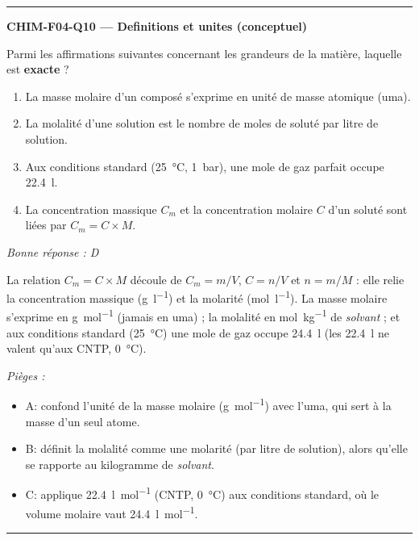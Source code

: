 \documentclass[11pt,a4paper]{article}
\begin{document}
\vspace{8pt}\hrule\vspace{8pt}
\noindent\textbf{CHIM-F04-Q10 --- Definitions et unites (conceptuel)}\par
Parmi les affirmations suivantes concernant les grandeurs de la matière, laquelle est \textbf{exacte} ?
\begin{enumerate}[label=\Alph*)]
\item La masse molaire d'un composé s'exprime en unité de masse atomique (uma).
\item La molalité d'une solution est le nombre de moles de soluté par litre de solution.
\item Aux conditions standard (\qty{25}{\celsius}, \qty{1}{\bar}), une mole de gaz parfait occupe \qty{22.4}{\litre}.
\item La concentration massique $C_m$ et la concentration molaire $C$ d'un soluté sont liées par $C_m = C\times M$.
\end{enumerate}
\textit{Bonne réponse : D}\par
La relation $C_m = C\times M$ découle de $C_m = m/V$, $C = n/V$ et $n = m/M$ : elle relie la concentration massique (\si{\gram\per\litre}) et la molarité (\si{\mole\per\litre}). La masse molaire s'exprime en \si{\gram\per\mole} (jamais en uma) ; la molalité en \si{\mole\per\kilo\gram} de \emph{solvant} ; et aux conditions standard (\qty{25}{\celsius}) une mole de gaz occupe \qty{24.4}{\litre} (les \qty{22.4}{\litre} ne valent qu'aux CNTP, \qty{0}{\celsius}).\par
\textit{Pièges :}
\begin{itemize}
\item A: confond l'unité de la masse molaire (\si{\gram\per\mole}) avec l'uma, qui sert à la masse d'un seul atome.
\item B: définit la molalité comme une molarité (par litre de solution), alors qu'elle se rapporte au kilogramme de \emph{solvant}.
\item C: applique \qty{22.4}{\litre\per\mole} (CNTP, \qty{0}{\celsius}) aux conditions standard, où le volume molaire vaut \qty{24.4}{\litre\per\mole}.
\end{itemize}
\vspace{8pt}\hrule\vspace{8pt}
\end{document}
